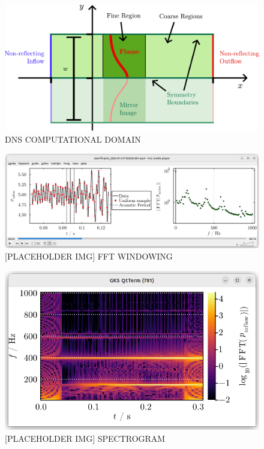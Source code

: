 \begin{figure}[t]
\centering
\includegraphics[scale=0.65]{assets/imgs/DNS-computational-domain.pdf}
\caption{DNS COMPUTATIONAL DOMAIN}
\label{fig:DNS-domain}
\end{figure}



\begin{figure}[t]
\centering
\includegraphics[scale=0.35]{assets/graphs/fft-windowing.png}
\caption{[PLACEHOLDER IMG] FFT WINDOWING}
\label{fig:windowing}
\end{figure}

\begin{figure}[t]
\centering
\includegraphics[scale=0.35]{assets/graphs/spectrogram.png}
\caption{[PLACEHOLDER IMG] SPECTROGRAM}
\label{fig:spectrogram}
\end{figure}

